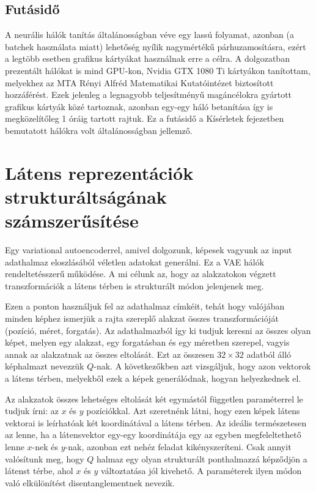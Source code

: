 \subsection{Futásidő}

A neurális hálók tanítás általánosságban véve egy lassú folyamat, azonban (a batchek használata miatt) lehetőség nyílik nagymértékű párhuzamosításra, ezért a legtöbb esetben grafikus kártyákat használnak erre a célra. A dolgozatban prezentált hálókat is mind GPU-kon, Nvidia GTX 1080 Ti kártyákon tanítottam, melyekhez az MTA Rényi Alfréd Matematikai Kutatóintézet biztosított hozzáférést. Ezek jelenleg a legnagyobb teljesítményű magáncélokra gyártott grafikus kártyák közé tartoznak, azonban egy-egy háló betanítása így is megközelítőleg 1 óráig tartott rajtuk. Ez a futásidő a Kísérletek fejezetben bemutatott hálókra volt általánosságban jellemző.

\section{Látens reprezentációk strukturáltságának\\ számszerűsítése}

Egy variational autoencoderrel, amivel dolgozunk, képesek vagyunk az input adathalmaz eloszlásából véletlen adatokat generálni. Ez a VAE hálók rendeltetésszerű működése. A mi célunk az, hogy az alakzatokon végzett transzformációk a látens térben is strukturált módon jelenjenek meg.

Ezen a ponton használjuk fel az adathalmaz címkéit, tehát hogy valójában minden képhez ismerjük a rajta szereplő alakzat összes transzformációját (pozíció, méret, forgatás). Az adathalmazból így ki tudjuk keresni az összes olyan képet, melyen egy alakzat, egy forgatásban és egy méretben szerepel, vagyis annak az alakzatnak az összes eltolását. Ezt az összesen $32\times32$ adatból álló képhalmazt nevezzük $Q$-nak. A következőkben azt vizsgáljuk, hogy azon vektorok a látens térben, melyekből ezek a képek generálódnak, hogyan helyezkednek el.

Az alakzatok összes lehetséges eltolását két egymástól független paraméterrel le tudjuk írni: az $x$ és $y$ pozíciókkal. Azt szeretnénk látni, hogy ezen képek látens vektorai is leírhatóak két koordinátával a látens térben. Az ideális természetesen az lenne, ha a látensvektor egy-egy koordinátája egy az egyben megfeleltethető lenne $x$-nek és $y$-nak, azonban ezt nehéz feladat kikényszeríteni. Csak annyit valósítunk meg, hogy $Q$ halmaz egy olyan strukturált ponthalmazzá képződjön a látenst térbe, ahol $x$ és $y$ változtatása jól kivehető. A paraméterek ilyen módon való elkülönítést disentanglementnek nevezik.

